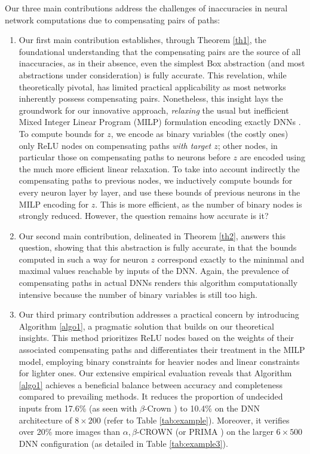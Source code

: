 Our three main contributions address the challenges of inaccuracies in neural network computations due to compensating pairs of paths:
\begin{enumerate}
	\item  Our first main contribution establishes, through Theorem \ref{th1}, the foundational understanding that the compensating pairs are the 	%
	source of all inaccuracies, 
	 as in their absence, even the simplest Box abstraction (and most abstractions under consideration) is fully accurate.
	This revelation, while theoretically pivotal, has limited practical applicability as most networks inherently possess compensating pairs. Nonetheless, this insight lays the groundwork for our innovative approach, {\em relaxing} the usual but inefficient Mixed Integer Linear Program (MILP) formulation encoding exactly DNNs \cite{MILP}. To compute bounds for $z$, we encode as binary variables (the costly ones) only ReLU nodes on compensating paths {\em with target $z$}; other nodes, in particular those on compensating paths to neurons before $z$ are encoded using the much more efficient linear relaxation. To take into account indirectly the compensating paths to previous nodes, we inductively compute bounds for every neuron layer by layer, and use these bounds of previous neurons in the MILP encoding for $z$. This is more efficient, as the number of binary nodes is strongly reduced. However, the question remains how accurate is it?
	
\item  Our second main contribution, delineated in Theorem \ref{th2}, answers this question, showing that this abstraction is fully accurate, in that the bounds computed in such a way for neuron $z$ correspond exactly to the mininmal and maximal values reachable by inputs of the DNN. Again, the prevalence of compensating paths in actual DNNs renders this algorithm computationally intensive because the number of binary variables is still too high.


\item Our third primary contribution addresses a practical concern by introducing Algorithm \ref{algo1}, a pragmatic solution that builds on our theoretical insights. This method prioritizes ReLU nodes based on the weights of their associated compensating paths and differentiates their treatment in the MILP model, employing binary constraints for heavier nodes and linear constraints for lighter ones. Our extensive empirical evaluation reveals that Algorithm \ref{algo1} achieves a beneficial balance between accuracy and completeness compared to prevailing methods. It reduces the proportion of undecided inputs from 17.6\% (as seen with $\beta$-Crown \cite{crown}) to 10.4\% on the DNN architecture of $8 \times 200$ (refer to Table \ref{tab:example}). Moreover, it verifies over 20\% more images than $\alpha,\beta$-CROWN \cite{xu2020fast} (or PRIMA \cite{prima}) on the larger $6 \times 500$ DNN configuration (as detailed in Table \ref{tab:example3}).


\end{enumerate}

